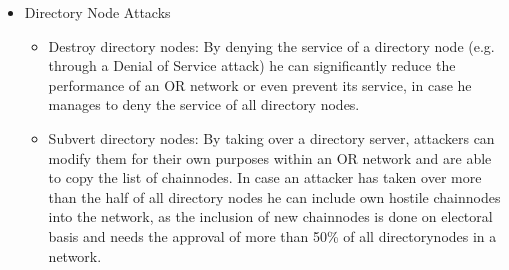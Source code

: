 \documentclass{sig-alternate}
\begin{document}
\begin{description}
\begin{itemize}
\begin{itemize}
		\end{itemize}
		\item Directory Node Attacks
			\begin{itemize} \itemsep0pt 
			\item Destroy directory nodes: By denying the service of a directory node (e.g. through a Denial of Service attack) he can significantly reduce the performance of an OR network or even prevent its service, in case he manages to deny the service of all directory nodes.
			\item Subvert directory nodes: By taking over a directory server, attackers can modify them for their own purposes within an OR network and are able to copy the list of chainnodes. In case an attacker has taken over more than the half of all directory nodes he can include own hostile chainnodes into the network, as the inclusion of new chainnodes is done on electoral basis and needs the approval of more than 50\% of all directorynodes in a network.
		\end{itemize}
	\end{itemize}
\end{description}
\end{document}
